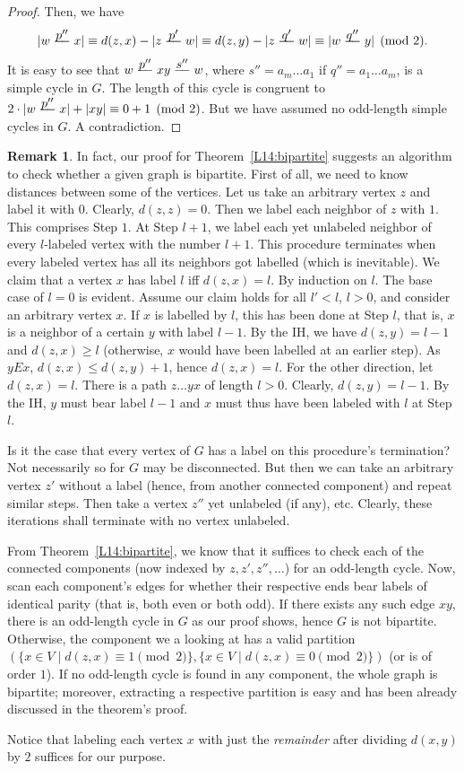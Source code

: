 \documentclass[12pt,notitlepage]{article}
\theoremstyle{plain}
\theoremstyle{definition}
\newtheorem{rem}[thm]{Remark}
\theoremstyle{plain}
\newcommand{\1}{\mathbf{1}}
\newcommand{\0}{\mathbf{0}}
\newcommand{\pth}[1]{\overset{\raisebox{0.25em}{$ #1 $}}{\relbar\hspace{-.8mm}\relbar}}
\begin{document}
\begin{proof}
Then, we have
$$
|w \pth{p''} x| \equiv d(z,x) - |z \pth{p'} w| \equiv d(z,y) - |z \pth{q'} w| \equiv |w \pth{q''} y| \pmod 2.
$$
It is easy to see that $w \pth{p''} x y \pth{s''} w$, where $s'' = a_m \ldots a_1$ if $q'' = a_1 \ldots a_m$, is a simple cycle in $G$. The length of this cycle is congruent to $2 \cdot |w \pth{p''} x| + |x y| \equiv 0 + 1 \pmod 2$. But we have assumed no odd-length simple cycles in $G$. A contradiction.
\end{proof}

\begin{rem}\label{graph:part_algo}
In fact, our proof for Theorem~\ref{L14:bipartite} suggests an algorithm to check whether a given graph is bipartite. First of all, we need to know distances between some of the vertices. Let us take an arbitrary vertex $z$ and label it with $0$. Clearly, $d(z,z) = 0$. Then we label each neighbor of $z$ with $1$. This comprises Step $1$. At Step $l + 1$, we label each yet unlabeled neighbor of every $l$-labeled vertex with the number $l + 1$. This procedure terminates when every labeled vertex has all its neighbors got labelled (which is inevitable). We claim that a vertex $x$ has label $l$ iff $d(z, x) = l$. By induction on $l$. The base case of $l = 0$ is evident. Assume our claim holds for all $l' < l$, $l > 0$, and consider an arbitrary vertex $x$. If $x$ is labelled by $l$, this has been done at Step $l$, that is, $x$ is a neighbor of a certain $y$ with label $l - 1$. By the IH, we have $d(z,y) = l - 1$ and $d(z, x)\geq l$ (otherwise, $x$ would have been labelled at an earlier step). As $y E x$, $d(z, x) \leq d(z, y) + 1$, hence $d(z, x) = l$. For the other direction, let $d(z,x) = l$. There is a path $z \ldots y x$ of length $l > 0$. Clearly, $d(z,y) = l - 1$. By the IH, $y$ must bear label $l - 1$ and $x$ must thus have been labeled with $l$ at Step $l$.

Is it the case that every vertex of $G$ has a label on this procedure's termination? Not necessarily so for $G$ may be disconnected. But then we can take an arbitrary vertex $z'$ without a label (hence, from another connected component) and repeat similar steps. Then take a vertex $z''$ yet unlabeled (if any), etc. Clearly, these iterations shall terminate with no vertex unlabeled.

From Theorem~\ref{L14:bipartite}, we know that it suffices to check each of the connected components (now indexed by $z, z', z'',\ldots$) for an odd-length cycle. Now, scan each component's edges for whether their respective ends bear labels of identical parity (that is, both even or both odd). If there exists any such edge $xy$, there is an odd-length cycle in $G$ as our proof shows, hence $G$ is not bipartite. Otherwise, the component we a looking at has a valid partition $(\{x \in V \mid d(z,x)\equiv 1 \pmod 2\}, \{x \in V \mid d(z,x)\equiv 0 \pmod 2\})$ (or is of order $1$). If no odd-length cycle is found in any component, the whole graph is bipartite; moreover, extracting a respective partition is easy and has been already discussed in the theorem's proof.

Notice that labeling each vertex $x$ with just the \emph{remainder} after dividing $d(x,y)$ by $2$ suffices for our purpose.
\end{rem}
\end{document}
